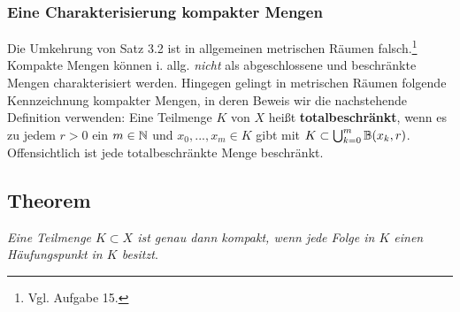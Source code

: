 \documentclass[a4paper,twoside]{book}
\begin{document}
\subsubsection{Eine Charakterisierung kompakter Mengen}

Die Umkehrung von Satz 3.2 ist in allgemeinen metrischen Räumen falsch.\footnote{Vgl. Aufgabe 15.} Kompakte
Mengen können i. allg. \textit{nicht} als abgeschlossene und beschränkte Mengen
charakterisiert werden. Hingegen gelingt in metrischen Räumen folgende Kennzeichnung
kompakter Mengen, in deren Beweis wir die nachstehende Definition
verwenden: Eine Teilmenge $K$ von $X$ heißt \textbf{totalbeschränkt}, wenn es zu jedem
$r > 0$ ein $m \in \mathbb{N}$ und $x_0, . . . , x_m \in K$ gibt mit $K \subset \bigcup^m_{k=0} \mathbb{B}(x_k, r)$. Offensichtlich
ist jede totalbeschränkte Menge beschränkt.

\subsection{Theorem} \textit{Eine Teilmenge $K \subset X$ ist genau dann kompakt, wenn jede Folge
in $K$ einen Häufungspunkt in $K$ besitzt}. \medskip
\end{document}
